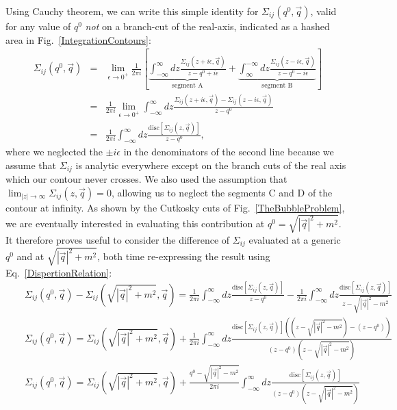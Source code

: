 \documentclass[11pt]{article}
\begin{document}
Using Cauchy theorem, we can write this simple identity for $\Sigma_{ij}(q^0, \vec{q})$, valid for any value of $q^0$ \emph{not} on a branch-cut of the real-axis, indicated as a hashed area in Fig.~\ref{IntegrationContours}:
\begin{eqnarray}
\Sigma_{ij}(q^0, \vec{q}) &=& \lim_{\epsilon \rightarrow 0^+}\frac{1}{2\pi i} \left[ 
\underbrace{ \int_{-\infty}^\infty d z \frac{ \Sigma_{ij}(z+i\epsilon, \vec{q}) }{z-q^0+i\epsilon} }_{\textrm{segment A}} +
\underbrace{ \int_{\infty}^{-\infty} d z \frac{ \Sigma_{ij}(z-i\epsilon, \vec{q}) }{z-q^0-i\epsilon} }_{\textrm{segment B}}
\right ] \nonumber \\
&=& 
\frac{1}{2\pi i}  \lim_{\epsilon \rightarrow 0^+} \int_{-\infty}^\infty d z \frac{ \Sigma_{ij}(z+i\epsilon, \vec{q}) -  \Sigma_{ij}(z-i\epsilon, \vec{q})  }{z-q^0} \nonumber \\
&=&
\frac{1}{2\pi i} \int_{-\infty}^\infty d z \frac{ \textrm{disc} \left[ \Sigma_{ij}(z, \vec{q}) \right] }{z-q^0},\label{DispertionRelation}
\end{eqnarray}
where we neglected the $\pm i \epsilon$ in the denominators of the second line because we assume that $\Sigma_{ij}$ is analytic everywhere except on the branch cuts of the real axis which our contour never crosses. We also used the assumption that $\lim_{|z| \rightarrow \infty} \Sigma_{ij}(z, \vec{q}) = 0$, allowing us to neglect the segments C and D of the contour at infinity.
As shown by the Cutkosky cuts of Fig.~\ref{TheBubbleProblem}, we are eventually interested in evaluating this contribution at $q^0=\sqrt{|\vec{q}|^2+m^2}$. It therefore proves useful to consider the difference of $\Sigma_{ij}$ evaluated at a generic $q^0$ and at $\sqrt{|\vec{q}|^2+m^2}$, both time re-expressing the result using Eq.~\ref{DispertionRelation}:
\begin{eqnarray}
&&\Sigma_{ij}(q^0, \vec{q}) - \Sigma_{ij}(\sqrt{|\vec{q}|^2+m^2}, \vec{q}) = 
\frac{1}{2\pi i} \int_{-\infty}^\infty d z \frac{ \textrm{disc} \left[ \Sigma_{ij}(z, \vec{q}) \right] }{z-q^0}
-
\frac{1}{2\pi i} \int_{-\infty}^\infty d z \frac{ \textrm{disc} \left[ \Sigma_{ij}(z, \vec{q}) \right] }{z-\sqrt{|\vec{q}|^2-m^2}} \nonumber \\
&&\Sigma_{ij}(q^0, \vec{q}) = \Sigma_{ij}(\sqrt{|\vec{q}|^2+m^2}, \vec{q}) +
\frac{1}{2\pi i} \int_{-\infty}^\infty d z \frac{ 
\textrm{disc} \left[ \Sigma_{ij}(z, \vec{q}) \right] \left( (z-\sqrt{|\vec{q}|^2-m^2}) -  (z-q^0) \right)
}{( z-q^0) (z-\sqrt{|\vec{q}|^2-m^2}) } \nonumber \\
&&\Sigma_{ij}(q^0, \vec{q}) = \Sigma_{ij}(\sqrt{|\vec{q}|^2+m^2}, \vec{q}) +
\frac{q^0 -\sqrt{|\vec{q}|^2-m^2} }{2\pi i} \int_{-\infty}^\infty d z \frac{ 
\textrm{disc} \left[ \Sigma_{ij}(z, \vec{q}) \right]
}{( z-q^0) (z-\sqrt{|\vec{q}|^2-m^2}) }\label{SubtractionProcedure}
\end{eqnarray}
\end{document}
